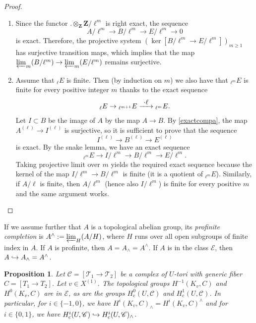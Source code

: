 \documentclass[JEP,XML,SOM,Unicode, NoEqCountersInSection]{cedram}
\let\mathcal\mathscr
\newenvironment{enumeratea}
{\bgroup\def\theenumi{\alph{enumi}}\begin{enumerate}}
{\end{enumerate}\egroup}
\newcommand\hto{\mathrel{\lhook\joinrel\to}}
\newcommand\To[1]{\mathchoice{\xrightarrow{\textstyle\kern4pt#1\kern3pt}}{\stackrel{#1}{\longrightarrow}}{}{}}
\newcommand{\rc}{\mathrm{c}}
\theoremstyle{plain}
\newtheorem{prop}[theo]{Proposition}
\theoremstyle{definition}
\newcommand \ZZ {\mathbf{Z}}
\newcommand \cT {\mathcal{T}}
\newcommand \cC {\mathcal{C}}
\begin{document}
\skpt
\begin{proof}
\begin{enumeratea}
\item
Since the functor $. \otimes_{\ZZ} \ZZ/\ell^m$ is right exact,
the sequence
\[
A/\ell^m \to B/\ell^m \to E/\ell^m \to 0
\]
is exact. Therefore, the projective system
$(\ker [B/\ell^m \to E/\ell^m])_{m \geq 1}$
has surjective transition maps, which
implies that the map $\varprojlim_m (B/\ell^m) \to \varprojlim_m (E/\ell^m)$
remains surjective.

\item
Assume that $_{\ell} E $ is finite. Then
(by induction on $m$) we also have that $_{\ell^m} E$ is finite
for every positive integer $m$ thanks to the exact sequence
\[
_{\ell} E \to{}_{\ell^{m+1}} E \To{\cdot\ell}{}_{\ell^m} E.
\]
Let $I \subset B$ be the image of $A$ by the map $A \to B$.
By \eqref{exactcompa}, the map $A^{(\ell)} \to I^{(\ell)}$ is surjective, so
it is sufficient to prove that the sequence
\[
I^{(\ell)} \to B^{(\ell)} \to E^{(\ell)}
\]
is exact. By the snake lemma, we have an exact sequence
\[
_{\ell^m} E \to I/\ell^m \to B/\ell^m \to E/\ell^m.
\]
Taking projective limit over $m$ yields the required exact sequence
because the kernel of the map $I/\ell^m \to B/\ell^m$ is finite
(it is a quotient of $_{\ell^m} E$). Similarly, if $A/\ell$ is finite,
then $A/\ell^m$ (hence also $I/\ell^m$) is finite for every positive
$m$ and the same argument works.\qedhere
\end{enumeratea}
\end{proof}

If we assume further that $A$ is a topological
abelian group, its \emph{profinite completion} is
$A^{\wedge}:=\varprojlim_H (A/H)$,
where $H$ runs over all open subgroups of finite index
in $A$. If $A$ is profinite, then $A=A_{\wedge}=A^{\wedge}$. If $A$ is in
the class $\mathcal E$, then $A \hto A_{\wedge}=A^{\wedge}$.

\begin{prop} \label{injectcompl}
Let $\mathcal C=[\cT_1 \to \cT_2]$ be a complex of $U$-tori with generic fiber
$C=[T_1 \to T_2]$. Let $v \in X^{(1)}$.
The topological groups $H^{-1}(K_v,C)$ and $H^0(K_v,C)$ are
in $\mathcal E$, as are
the groups $H^0_\rc(U,\cC)$ and $H^1_\rc(U,\cC)$. In particular, for
$i \in \{-1, 0\}$, we have $H^i(K_v,C)_{\wedge}=H^i(K_v,C)^{\wedge}$
and for $i \in \{0, 1\}$, we have $H^i_\rc(U,\cC) \hto
H^i_\rc(U,\cC)_{\wedge}$.
\end{prop}
\end{document}

